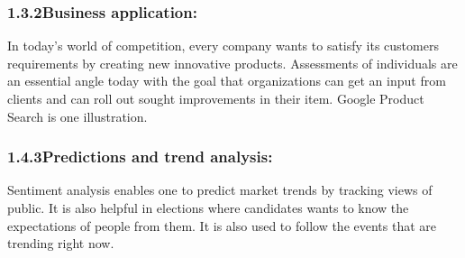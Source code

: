 \documentclass[12pt]{article}
\begin{document}
\subsubsection*{1.3.2\hspace*{10pt}Business application:}
\begin{justify}
In today’s world of competition, every company wants to satisfy its customers requirements by creating new innovative products. Assessments of individuals are an essential angle today with the goal that organizations can get an input from clients and can roll out sought improvements in their item. Google Product Search is one illustration.
\end{justify}\par

\subsubsection*{1.4.3\hspace*{10pt}Predictions and trend analysis:}
\begin{justify}
Sentiment analysis enables one to predict market trends by tracking views of public. It is also helpful in elections where candidates wants to know the expectations of people from them. It is also used to follow the events that are trending right now.
\end{justify}\par


\vspace{\baselineskip}

\vspace{\baselineskip}

\vspace{\baselineskip}

\vspace{\baselineskip}

\vspace{\baselineskip}

\vspace{\baselineskip}

\vspace{\baselineskip}

\vspace{\baselineskip}

\vspace{\baselineskip}
\end{document}
